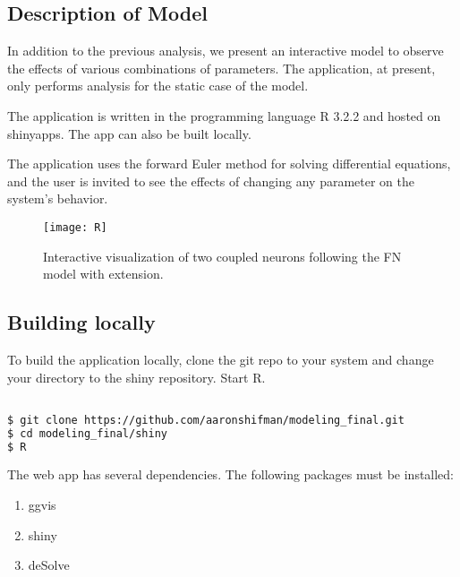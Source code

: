 \documentclass[11pt]{report}
\begin{document}


\subsection{Description of Model} %
\label{sub:description_of_model}

In addition to the previous analysis, we present an interactive model to observe the effects of various combinations of parameters. The application, at present, only performs analysis for the static case of the model.

The application is written in the programming language R 3.2.2 and hosted on shinyapps. The app can also be built locally. 

The application uses the forward Euler method for solving differential equations, and the user is invited to see the effects of changing any parameter on the system's behavior. 


\begin{figure}[!ht]
  \caption{Interactive visualization of two coupled neurons following the FN model with extension. }
  \centering
    \texttt{[image: R]}
\end{figure}

\newpage

\subsection{Building locally} %
\label{sub:building_locally}

To build the application locally, clone the git repo to your system and change your directory to the shiny repository. Start R. 

\begin{lstlisting}[language = sh]

$ git clone https://github.com/aaronshifman/modeling_final.git
$ cd modeling_final/shiny 
$ R

\end{lstlisting}

The web app has several dependencies. The following packages must be installed:


\begin{enumerate}
  \item ggvis
  \item shiny
  \item deSolve
\end{enumerate}
\end{document}
